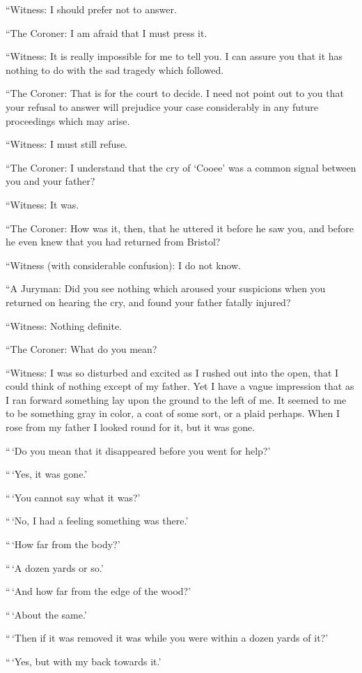 “Witness: I should prefer not to answer.

“The Coroner: I am afraid that I must press it.

“Witness: It is really impossible for me to tell you. I can
assure you that it has nothing to do with the sad tragedy
which followed.

“The Coroner: That is for the court to decide. I need
not point out to you that your refusal to answer will prejudice
your case considerably in any future proceedings which may
arise.

“Witness: I must still refuse.

“The Coroner: I understand that the cry of ‘Cooee’ was
a common signal between you and your father?

“Witness: It was.

“The Coroner: How was it, then, that he uttered it before
he saw you, and before he even knew that you had returned
from Bristol?

“Witness (with considerable confusion): I do not know.

“A Juryman: Did you see nothing which aroused your
suspicions when you returned on hearing the cry, and found
your father fatally injured?

“Witness: Nothing definite.

“The Coroner: What do you mean?

“Witness: I was so disturbed and excited as I rushed
out into the open, that I could think of nothing except of
my father. Yet I have a vague impression that as I ran forward
something lay upon the ground to the left of me. It
seemed to me to be something gray in color, a coat of some
sort, or a plaid perhaps. When I rose from my father I
looked round for it, but it was gone.

“\,‘Do you mean that it disappeared before you went for
help?’

“\,‘Yes, it was gone.’

“\,‘You cannot say what it was?’

“\,‘No, I had a feeling something was there.’

“\,‘How far from the body?’

“\,‘A dozen yards or so.’

“\,‘And how far from the edge of the wood?’

“\,‘About the same.’

“\,‘Then if it was removed it was while you were within a
dozen yards of it?’

“\,‘Yes, but with my back towards it.’

